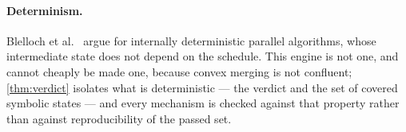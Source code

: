 \paragraph{Determinism.}
Blelloch et al.~\cite{Blelloch12} argue for internally deterministic parallel
algorithms, whose intermediate state does not depend on the schedule.  This
engine is not one, and cannot cheaply be made one, because convex merging is not
confluent; \cref{thm:verdict} isolates what is deterministic --- the verdict and
the set of covered symbolic states --- and every mechanism is checked against
that property rather than against reproducibility of the passed set.
